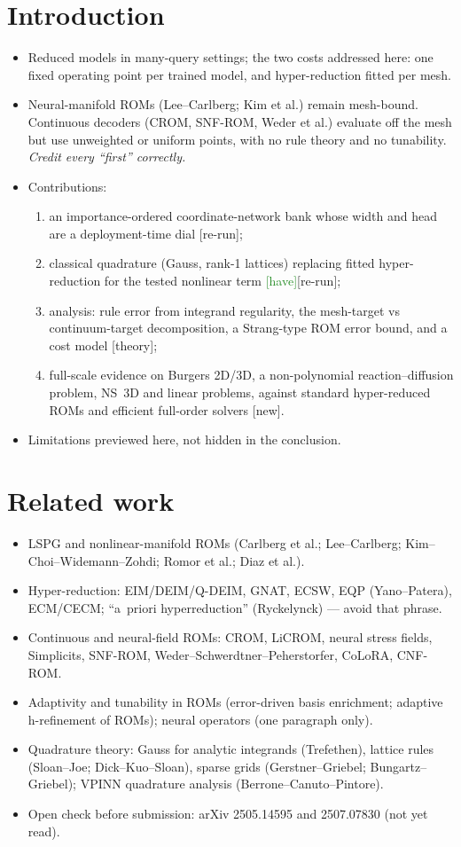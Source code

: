 \documentclass[11pt]{article}
\newcommand{\have}{\textsf{\small\textcolor{ForestGreen}{[have]}}}
\newcommand{\rerun}{\textsf{\small\textcolor{BurntOrange}{[re-run]}}}
\newcommand{\new}{\textsf{\small\textcolor{BrickRed}{[new]}}}
\newcommand{\thy}{\textsf{\small\textcolor{RoyalPurple}{[theory]}}}
\begin{document}
\section{Introduction}
\begin{itemize}
\item Reduced models in many-query settings; the two costs addressed here: one fixed operating point per trained model, and hyper-reduction fitted per mesh.
\item Neural-manifold ROMs (Lee--Carlberg; Kim et al.) remain mesh-bound. Continuous decoders (CROM, SNF-ROM, Weder et al.) evaluate off the mesh but use unweighted or uniform points, with no rule theory and no tunability. \emph{Credit every ``first'' correctly.}
\item Contributions:
 \begin{enumerate}[label=(C\arabic*)]
 \item an importance-ordered coordinate-network bank whose width and head are a deployment-time dial \rerun;
 \item classical quadrature (Gauss, rank-1 lattices) replacing fitted hyper-reduction for the tested nonlinear term \have\rerun;
 \item analysis: rule error from integrand regularity, the mesh-target vs continuum-target decomposition, a Strang-type ROM error bound, and a cost model \thy;
 \item full-scale evidence on Burgers 2D/3D, a non-polynomial reaction--diffusion problem, NS~3D and linear problems, against standard hyper-reduced ROMs and efficient full-order solvers \new.
 \end{enumerate}
\item Limitations previewed here, not hidden in the conclusion.
\end{itemize}

\section{Related work}
\begin{itemize}
\item LSPG and nonlinear-manifold ROMs (Carlberg et al.; Lee--Carlberg; Kim--Choi--Widemann--Zohdi; Romor et al.; Diaz et al.).
\item Hyper-reduction: EIM/DEIM/Q-DEIM, GNAT, ECSW, EQP (Yano--Patera), ECM/CECM; ``a~priori hyperreduction'' (Ryckelynck) --- avoid that phrase.
\item Continuous and neural-field ROMs: CROM, LiCROM, neural stress fields, Simplicits, SNF-ROM, Weder--Schwerdtner--Peherstorfer, CoLoRA, CNF-ROM.
\item Adaptivity and tunability in ROMs (error-driven basis enrichment; adaptive h-refinement of ROMs); neural operators (one paragraph only).
\item Quadrature theory: Gauss for analytic integrands (Trefethen), lattice rules (Sloan--Joe; Dick--Kuo--Sloan), sparse grids (Gerstner--Griebel; Bungartz--Griebel); VPINN quadrature analysis (Berrone--Canuto--Pintore).
\item Open check before submission: arXiv 2505.14595 and 2507.07830 (not yet read).
\end{itemize}
\end{document}
